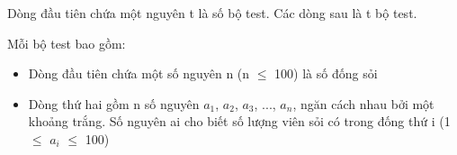 Dòng đầu tiên chứa một nguyên t là số bộ test. Các dòng sau là t bộ test.

Mỗi bộ test bao gồm:
\begin{itemize}
	\item Dòng đầu tiên chứa một số nguyên n (n  $\le$  100) là số đống sỏi
	\item Dòng thứ hai gồm n số nguyên $a_{1}$, $a_{2}$, $a_{3}$, ..., $a_{n}$, ngăn cách nhau bởi một khoảng trắng. Số nguyên ai cho biết số lượng viên sỏi có trong đống thứ i (1  $\le$  $a_{i}$  $\le$  100)
\end{itemize}